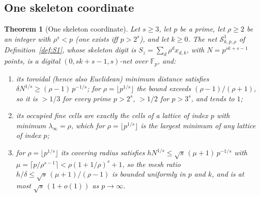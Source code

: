 \documentclass[11pt]{amsart}
\newtheorem{theorem}{Theorem}
\theoremstyle{definition}
\theoremstyle{plain}
\newcommand{\F}{\mathbb{F}}
\begin{document}
\subsection{One skeleton coordinate}

\begin{theorem}[One skeleton coordinate]\label{thm:S1}
Let $s\ge3$, let $p$ be a prime, let $\rho\ge2$ be an integer with $\rho^s<p$ (one exists iff $p>2^s$), and let $k\ge0$. The net $\mathcal S^1_{k,p,\rho}$ of Definition~\ref{def:S1}, whose skeleton digit is $S_z=\sum_d\rho^dx_{d,k}$, with $N=p^{sk+s-1}$ points, is a digital $(0,sk+s-1,s)$-net over $\F_p$, and:
\begin{enumerate}
\item its toroidal (hence also Euclidean) minimum distance satisfies $\delta N^{1/s}\ge(\rho-1)\,p^{-1/s}$; for $\rho=\lfloor p^{1/s}\rfloor$ the bound exceeds $(\rho-1)/(\rho+1)$, so it is $>1/3$ for every prime $p>2^s$, $>1/2$ for $p>3^s$, and tends to $1$;
\item its occupied fine cells are exactly the cells of a lattice of index $p$ with minimum $\lambda_\infty=\rho$, which for $\rho=\lfloor p^{1/s}\rfloor$ is the largest minimum of any lattice of index $p$;
\item for $\rho=\lfloor p^{1/s}\rfloor$ its covering radius satisfies $hN^{1/s}\le\sqrt s\,(\mu+1)\,p^{-1/s}$ with $\mu=\lceil p/\rho^{s-1}\rceil<\rho(1+1/\rho)^s+1$, so the mesh ratio $h/\delta\le\sqrt s\,(\mu+1)/(\rho-1)$ is bounded uniformly in $p$ and $k$, and is at most $\sqrt s\,(1+o(1))$ as $p\to\infty$.
\end{enumerate}
\end{theorem}
\end{document}
